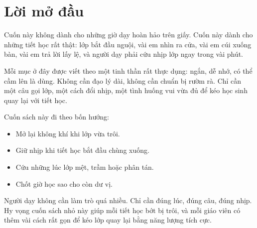 \chapter*{Lời mở đầu}

Cuốn này không dành cho những giờ dạy hoàn hảo trên giấy. Cuốn này dành cho những tiết học rất thật: lớp bắt đầu nguội, vài em nhìn ra cửa, vài em cúi xuống bàn, vài em trả lời lấy lệ, và người dạy phải cứu nhịp lớp ngay trong vài phút.

Mỗi mục ở đây được viết theo một tinh thần rất thực dụng: ngắn, dễ nhớ, có thể cầm lên là dùng. Không cần đạo lý dài, không cần chuẩn bị rườm rà. Chỉ cần một câu gọi lớp, một cách đổi nhịp, một tình huống vui vừa đủ để kéo học sinh quay lại với tiết học.

Cuốn sách này đi theo bốn hướng:

\begin{itemize}
\item Mở lại không khí khi lớp vừa trôi.
\item Giữ nhịp khi tiết học bắt đầu chùng xuống.
\item Cứu những lúc lớp mệt, trầm hoặc phân tán.
\item Chốt giờ học sao cho còn dư vị.
\end{itemize}

Người dạy không cần làm trò quá nhiều. Chỉ cần đúng lúc, đúng câu, đúng nhịp. Hy vọng cuốn sách nhỏ này giúp mỗi tiết học bớt bị trôi, và mỗi giáo viên có thêm vài cách rất gọn để kéo lớp quay lại bằng năng lượng tích cực.
